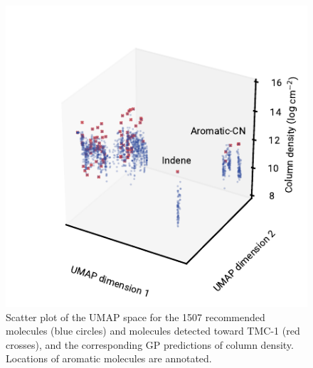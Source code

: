 \documentclass[twocolumn]{aastex63}
\begin{document}
\begin{figure}
    \centering
    \includegraphics[width=\columnwidth]{3d_umap_recommendations.pdf}
    \caption{Scatter plot of the UMAP space for the 1507 recommended molecules (blue circles) and molecules detected toward TMC-1 (red crosses), and the corresponding GP predictions of column density. Locations of aromatic molecules are annotated.}
    \label{fig:reccolumns}
\end{figure}



\end{document}
